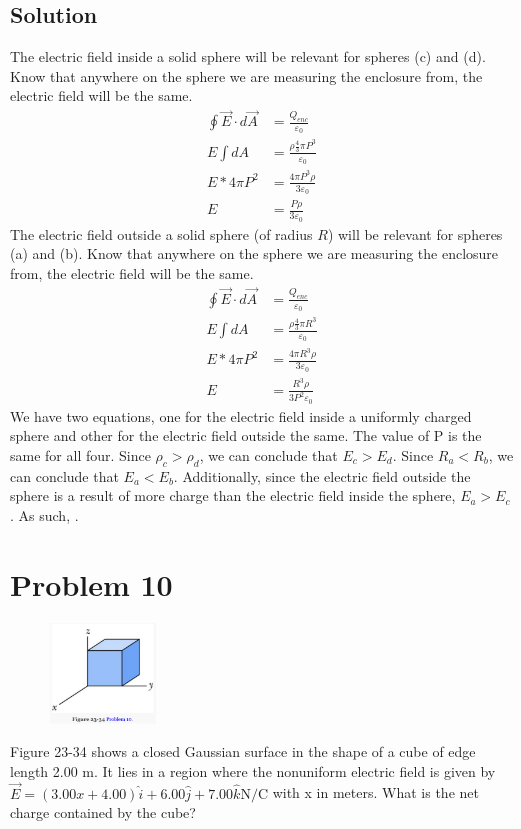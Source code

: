 \documentclass[12pt]{article}
\begin{document}
\subsection{Solution}
The electric field inside a solid sphere will be relevant for spheres (c) and (d). Know that anywhere on the sphere we are measuring the enclosure from, the electric field will be the same.
\begin{align*}
    \oint \vec{E} \cdot d\vec{A}    &=  \frac{Q_{enc}}{\varepsilon_0}\\
    E \int dA  &=  \frac{\rho \frac{4}{3}\pi P^3}{\varepsilon_0}\\
    E * 4\pi P^2    &=  \frac{4\pi P^3 \rho}{3 \varepsilon_0}\\
    E   &=  \frac{P \rho}{3 \varepsilon_0}
\end{align*}
The electric field outside a solid sphere (of radius $R$) will be relevant for spheres (a) and (b). Know that anywhere on the sphere we are measuring the enclosure from, the electric field will be the same.
\begin{align*}
    \oint \vec{E} \cdot d\vec{A}    &=  \frac{Q_{enc}}{\varepsilon_0}\\
    E \int dA   &=  \frac{\rho \frac{4}{3}\pi R^3}{\varepsilon_0}\\
    E * 4\pi P^2    &=  \frac{4\pi R^3 \rho}{3\varepsilon_0}\\
    E   &=  \frac{R^3 \rho}{3 P^2 \varepsilon_0}
\end{align*}
We have two equations, one for the electric field inside a uniformly charged sphere and other for the electric field outside the same. 
The value of P is the same for all four.
Since $\rho_c > \rho_d$, we can conclude that $E_c > E_d$.
Since $R_a < R_b$, we can conclude that $E_a < E_b$.
Additionally, since the electric field outside the sphere is a result of more charge than the electric field inside the sphere, $E_a > E_c$. 
As such, .


\pagebreak
\section{Problem 10}
\begin{figure}
    \vspace{-50pt}
    \includegraphics[width=0.25\textwidth]{picture_5.png} 
\end{figure}
Figure 23-34 shows a closed Gaussian surface in the shape of a cube of edge length 2.00 m. It lies in a region where the nonuniform electric field is given by $\vec{E} = (3.00x + 4.00)\hat{i} + 6.00\hat{j} + 7.00\hat{k} \unit{\newton/\coulomb}$ with x in meters. What is the net charge contained by the cube?
\end{document}
